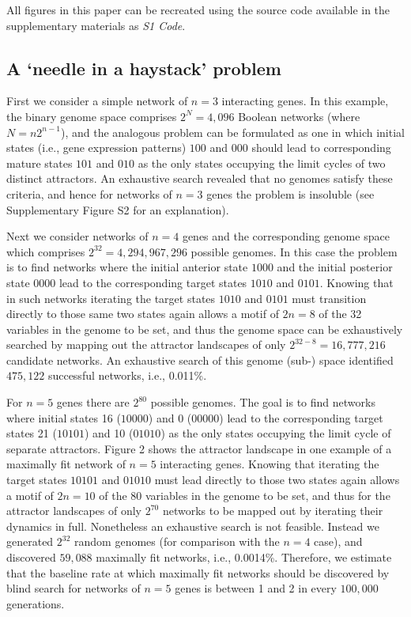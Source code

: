 \documentclass[10pt,letterpaper]{article}
\begin{document}
All figures in this paper can be recreated using the source code available in the supplementary materials as \emph{S1 Code}.

\subsection*{A `needle in a haystack' problem}

First we consider a simple network of $n=3$ interacting genes. In this example, the binary genome space comprises $2^N=4,096$ Boolean networks (where $N=n2^{n-1}$), and the analogous problem can be formulated as one in which initial states (i.e., gene expression patterns) $100$ and $000$ should lead to corresponding mature states $101$ and $010$ as the only states occupying the limit cycles of two distinct attractors. An exhaustive search revealed that no genomes satisfy these criteria, and hence for networks of $n=3$ genes the problem is insoluble (see Supplementary Figure S2 for an explanation).

Next we consider networks of $n=4$ genes and the corresponding genome space which comprises $2^{32}=4,294,967,296$ possible genomes. In this case the problem is to find networks where the initial anterior state $1000$ and the initial posterior state $0000$ lead to the corresponding target states $1010$ and $0101$. Knowing that in such networks iterating the target states $1010$ and $0101$ must transition directly to those same two states again allows a motif of $2n=8$ of the 32 variables in the genome to be set, and thus the genome space can be exhaustively searched by mapping out the attractor landscapes of only $2^{32-8}=16,777,216$ candidate networks. An exhaustive search of this genome (sub-) space identified $475,122$ successful networks, i.e., 0.011\%.

For $n=5$ genes there are $2^{80}$ possible genomes. The goal is to find networks where initial states 16 ($10000$) and 0 ($00000$) lead to the corresponding target states 21 ($10101$) and 10 ($01010$) as the only states occupying the limit cycle of separate attractors. Figure 2 shows the attractor landscape in one example of a maximally fit network of $n=5$ interacting genes. Knowing that iterating the target states $10101$ and $01010$ must lead directly to those two states again allows a motif of $2n=10$ of the 80 variables in the genome to be set, and thus for the attractor landscapes of only $2^{70}$ networks to be mapped out by iterating their dynamics in full. Nonetheless an exhaustive search is not feasible. Instead we generated $2^{32}$ random genomes (for comparison with the $n=4$ case), and discovered $59,088$ maximally fit networks, i.e., 0.0014\%. Therefore, we estimate that the baseline rate at which maximally fit networks should be discovered by blind search for networks of $n=5$ genes is between 1 and 2 in every $100,000$ generations.
\end{document}
